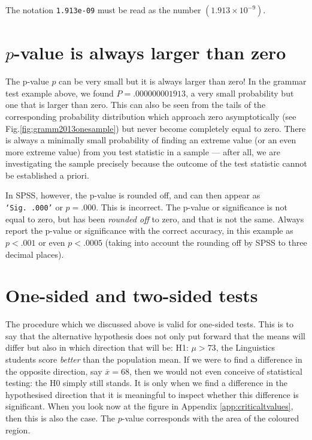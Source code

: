 \documentclass[
]{book}
\begin{document}
The notation \texttt{1.913e-09} must be read as the number
\((1.913 \times 10^{-9})\).

\hypertarget{sec:plargerthannull}{%
\section{\texorpdfstring{\(p\)-value is always larger than zero}{p-value is always larger than zero}}\label{sec:plargerthannull}}

The p-value \(p\) can be very small but it is always larger than zero!
In the grammar test example above,
we found \(P=.000000001913\), a very small probability but one that is larger
than zero. This can also be seen from the tails of the corresponding
probability distribution which approach zero asymptotically (see
Fig.\ref{fig:gramm2013onesample}) but never become completely equal
to zero. There is always a minimally small probability of finding
an extreme value (or an even more extreme value) from you test statistic
in a sample --- after all, we are investigating the sample precisely
because the outcome of the test statistic cannot be established a priori.

In SPSS, however, the p-value is rounded off, and can then appear as
\texttt{‘Sig.\ .000’} or \(p=.000\). This is incorrect.
The p-value or significance is not equal to zero, but has
been \emph{rounded off} to zero, and that is not the same.
Always report the p-value or significance with the correct
accuracy, in this example as \(p<.001\) or even \(p<.0005\)
(taking into account the rounding off by SPSS to three decimal
places).

\hypertarget{sec:ttest-onesidedtwosided}{%
\section{One-sided and two-sided tests}\label{sec:ttest-onesidedtwosided}}

The procedure which we discussed above is valid for one-sided
tests. This is to say that the alternative hypothesis does not only put forward
that the means will differ but also in which direction that will be:
H1: \(\mu >73\), the Linguistics students score \emph{better} than the population
mean. If we were to find a difference in the opposite direction,
say \(\overline{x}=68\), then we would not even conceive of statistical testing:
the H0 simply still stands. It is only when we find a difference
in the hypothesised direction that it is meaningful to inspect whether
this difference is significant. When you look now at the figure in
Appendix \ref{app:criticaltvalues}, then this is also the case. The \(p\)-value
corresponds with the area of the coloured region.
\end{document}
